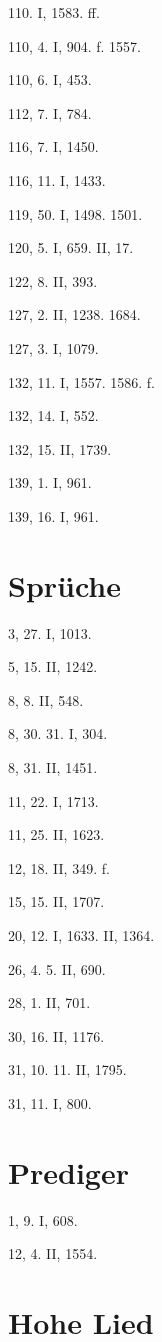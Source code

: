 110. I, 1583. ff.

110, 4. I, 904. f. 1557.

110, 6. I, 453.

112, 7. I, 784.

116, 7. I, 1450.

116, 11. I, 1433.

119, 50. I, 1498. 1501.

120, 5. I, 659. II, 17.

122, 8. II, 393.

127, 2. II, 1238. 1684.

127, 3. I, 1079.

132, 11. I, 1557. 1586. f.

132, 14. I, 552.

132, 15. II, 1739.

139, 1. I, 961.

139, 16. I, 961.

\section{Sprüche}

3, 27. I, 1013.

5, 15. II, 1242.

8, 8. II, 548.

8, 30. 31. I, 304.

8, 31. II, 1451.

11, 22. I, 1713.

11, 25. II, 1623.

12, 18. II, 349. f.

15, 15. II, 1707.

20, 12. I, 1633. II, 1364.

26, 4. 5. II, 690.

28, 1. II, 701.

30, 16. II, 1176.

31, 10. 11. II, 1795.

31, 11. I, 800.

\section{Prediger}

1, 9. I, 608.

12, 4. II, 1554.

\section{Hohe Lied}

